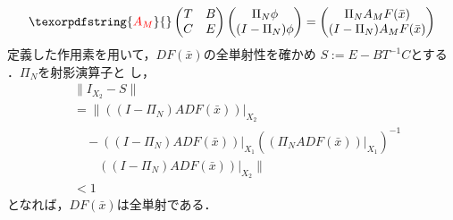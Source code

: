 \documentclass[a4paper,10pt,twocolumn]{jsarticle}
\providecommand{\DIFaddtex}[1]{{\protect\color{blue} \sf #1}} %
\providecommand{\DIFdeltex}[1]{{\protect\color{red} \scriptsize #1}} %
\providecommand{\DIFaddbegin}{} %
\providecommand{\DIFaddend}{} %
\providecommand{\DIFdelbegin}{} %
\providecommand{\DIFdelend}{} %
\providecommand{\DIFadd}[1]{\texorpdfstring{\DIFaddtex{#1}}{#1}} %
\providecommand{\DIFdel}[1]{\texorpdfstring{\DIFdeltex{#1}}{}} %
\newcommand{\DIFscaledelfig}{0.5}
\newlength{\DIFdelgraphicswidth} %
\newlength{\DIFdelgraphicsheight} %
\newcommand{\DIFaddincludegraphics}[2][]{{\color{blue}\fbox{\DIFOincludegraphics[#1]{#2}}}} %
\newcommand{\DIFdelincludegraphics}[2][]{%
\sbox{\DIFdelgraphicsbox}{\DIFOincludegraphics[#1]{#2}}%
\settoboxwidth{\DIFdelgraphicswidth}{\DIFdelgraphicsbox} %
\settoboxtotalheight{\DIFdelgraphicsheight}{\DIFdelgraphicsbox} %
\scalebox{\DIFscaledelfig}{%
\parbox[b]{\DIFdelgraphicswidth}{\usebox{\DIFdelgraphicsbox}\\[-\baselineskip] \rule{\DIFdelgraphicswidth}{0em}}\llap{\resizebox{\DIFdelgraphicswidth}{\DIFdelgraphicsheight}{%
\setlength{\unitlength}{\DIFdelgraphicswidth}%
\begin{picture}(1,1)%
\thicklines\linethickness{2pt} %
{\color[rgb]{1,0,0}\put(0,0){\framebox(1,1){}}}%
{\color[rgb]{1,0,0}\put(0,0){\line( 1,1){1}}}%
{\color[rgb]{1,0,0}\put(0,1){\line(1,-1){1}}}%
\end{picture}%
}\hspace*{3pt}}} %
} %
\DeclareRobustCommand{\DIFaddbegin}{\DIFOaddbegin \let\includegraphics\DIFaddincludegraphics} %
\DeclareRobustCommand{\DIFaddend}{\DIFOaddend \let\includegraphics\DIFOincludegraphics} %
\DeclareRobustCommand{\DIFdelbegin}{\DIFOdelbegin \let\includegraphics\DIFdelincludegraphics} %
\DeclareRobustCommand{\DIFdelend}{\DIFOaddend \let\includegraphics\DIFOincludegraphics} %
\begin{document}
\begin{equation}
  \DIFdelbegin \DIFdel{A_M }\DIFdelend \DIFaddbegin \begin{pmatrix}
    T & B \\
    C & E
  \end{pmatrix}
  \begin{pmatrix}
    \Pi_N \phi \\
    (I -\Pi_N) \phi
  \end{pmatrix}
  \DIFaddend =
  \DIFdelbegin %
\DIFdelend \DIFaddbegin \begin{pmatrix}
    \Pi_N A_M F(\bar{x}) \\
    (I - \Pi_N) A_M F(\bar{x})
  \end{pmatrix}\DIFaddend 
\DIFdelbegin %
\DIFdelend \end{equation}
\DIFdelbegin \DIFdel{定義した作用素を用いて，$DF(\bar{x})$の全単射性を確かめ}\DIFdelend \DIFaddbegin \DIFadd{$S:= E-BT^{-1}C$とす}\DIFaddend る\DIFdelbegin \DIFdel{．$\Pi_N$を射影演算子}\DIFdelend と\DIFdelbegin \DIFdel{し}\DIFdelend ，
\begin{equation}
  \begin{split}
    &\| I_{X_2} - S\|\\
    &= \| \left( \left( I-\Pi_N \right) ADF ( \bar{x} ) \right)|_{X_2}  \\
    &\quad -(\left( I-\Pi_N \right) ADF( \bar{x} ))|_{X_1} \left((\Pi_N ADF(\bar{x}))|_{X_1}\right)^{-1}\\
    &\qquad ((I-\Pi_N)ADF(\bar{x}))|_{X_2} \| \\
    & < 1
  \end{split}
\end{equation}
となれば，$DF(\bar{x})$は全単射である．
\vspace{-1mm}
\end{document}

